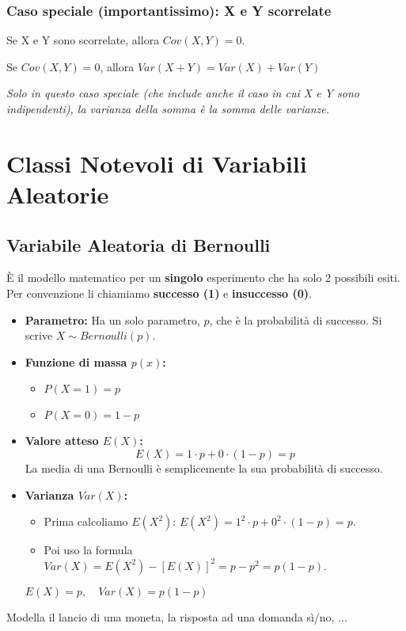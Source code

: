 \documentclass[a4paper, 11pt]{article}
\theoremstyle{definition}
\begin{document}
\subsubsection*{Caso speciale (importantissimo): X e Y scorrelate}
Se X e Y sono scorrelate, allora $Cov(X,Y)=0$.
\begin{formulabox}
    Se $Cov(X,Y)=0$, allora $Var(X+Y) = Var(X) + Var(Y)$
\end{formulabox}
\textit{Solo in questo caso speciale (che include anche il caso in cui X e Y sono indipendenti), la varianza della somma è la somma delle varianze.}

\newpage

\section{Classi Notevoli di Variabili Aleatorie}

\subsection{Variabile Aleatoria di Bernoulli}
È il modello matematico per un \textbf{singolo} esperimento che ha solo 2 possibili esiti. Per convenzione li chiamiamo \textbf{successo (1)} e \textbf{insuccesso (0)}.

\begin{itemize}
    \item \textbf{Parametro:} Ha un solo parametro, $p$, che è la probabilità di successo. Si scrive $X \sim Bernoulli(p)$.

    \item \textbf{Funzione di massa $p(x)$:}
    \begin{itemize}
        \item $P(X=1) = p$
        \item $P(X=0) = 1-p$
    \end{itemize}

    \item \textbf{Valore atteso $E(X)$:}
    \[ E(X) = 1 \cdot p + 0 \cdot (1-p) = p \]
    La media di una Bernoulli è semplicemente la sua probabilità di successo.

    \item \textbf{Varianza $Var(X)$:}
    \begin{itemize}
        \item Prima calcoliamo $E(X^2)$: $E(X^2) = 1^2 \cdot p + 0^2 \cdot (1-p) = p$.
        \item Poi uso la formula $Var(X) = E(X^2) - [E(X)]^2 = p - p^2 = p(1-p)$.
    \end{itemize}
    \begin{formulabox}
        $E(X)=p, \quad Var(X)=p(1-p)$
    \end{formulabox}
\end{itemize}
Modella il lancio di una moneta, la risposta ad una domanda sì/no, ...
\end{document}
